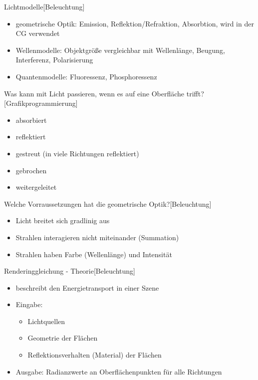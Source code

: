 \documentclass[a7paper,print]{kartei}
\begin{document}
\begin{karte}[CGIS]{Lichtmodelle}[Beleuchtung]
\begin{itemize}
\item geometrische Optik: Emission, Reflektion/Refraktion, Absorbtion, wird in der CG verwendet
\item Wellenmodelle: Objektgröße vergleichbar mit Wellenlänge, Beugung, Interferenz, Polarisierung
\item Quantenmodelle: Fluoressenz, Phosphoressenz
\end{itemize}
\end{karte}

\begin{karte}[CGIS]{Was kann mit Licht passieren, wenn es auf eine Oberfläche trifft?}[Grafikprogrammierung]
\begin{itemize}
\item absorbiert
\item reflektiert
\item gestreut (in viele Richtungen reflektiert)
\item gebrochen
\item weitergeleitet
\end{itemize}
\end{karte}

\begin{karte}[CGIS]{Welche Vorraussetzungen hat die geometrische Optik?}[Beleuchtung]
\begin{itemize}
\item Licht breitet sich gradlinig aus
\item Strahlen interagieren nicht miteinander (Summation)
\item Strahlen haben Farbe (Wellenlänge) und Intensität
\end{itemize}
\end{karte}

\begin{karte}[CGIS]{Renderinggleichung - Theorie}[Beleuchtung]
\begin{itemize}
\item beschreibt den Energietransport in einer Szene
\item Eingabe:
	\begin{itemize}
	\item Lichtquellen
	\item Geometrie der Flächen
	\item Reflektionsverhalten (Material) der Flächen
	\end{itemize}
\item Ausgabe: Radianzwerte an Oberflächenpunkten für alle Richtungen
\end{itemize}
\end{karte}
\end{document}
